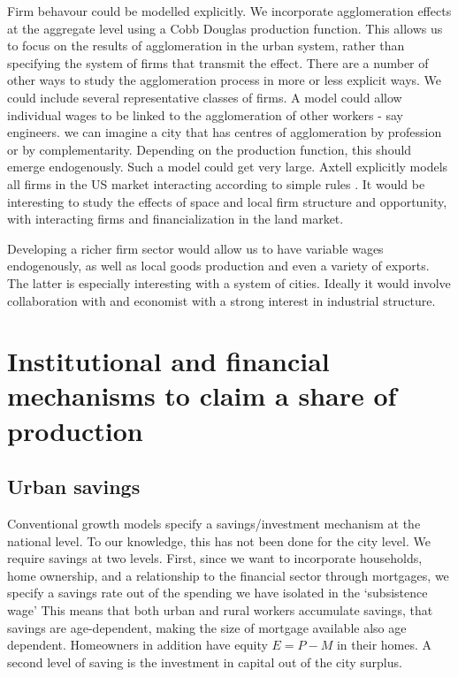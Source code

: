 Firm behavour could be modelled explicitly. We incorporate agglomeration effects at the aggregate level using a Cobb Douglas production function. This allows us to focus on the results of agglomeration in the urban system, rather than specifying the system of firms that transmit the effect. 
There are a number of other ways to study the agglomeration process in more or less explicit ways. We could include several representative classes of firms. %
A  model could allow individual wages to be linked to the agglomeration of other workers - say engineers. we can imagine a city that has centres of agglomeration by profession or by complementarity. Depending on the production function, this should emerge endogenously. Such a  model could get very large. Axtell explicitly models all firms in the US market interacting according to simple rules \cite{axtellDynamicsFirmsData2024}. It would be interesting to study the effects of space and local firm structure and opportunity, with interacting firms and financialization in the land market. 

Developing a richer firm sector would allow us to have variable wages endogenously, as well as local goods production and even a variety of exports. The latter is especially interesting with a system of cities. Ideally it would involve collaboration with and economist with  a strong interest in industrial structure.  

\section{Institutional and financial mechanisms to claim a share of production}

\subsection{Urban savings}

Conventional growth models specify a savings/investment mechanism at the national level. To our knowledge, this has not been done for the city level. We require savings at two levels. First, since we want to incorporate households, home ownership, and a relationship to the financial sector through mortgages, we specify a savings rate out of the spending we have isolated in the `subsistence wage' This means that both urban and rural workers accumulate savings, that savings are age-dependent, making the size of mortgage available also age dependent. 
Homeowners in addition have equity $E=P-M$ in their homes. %
{A second level of saving is the investment in capital out of the city surplus.} %

